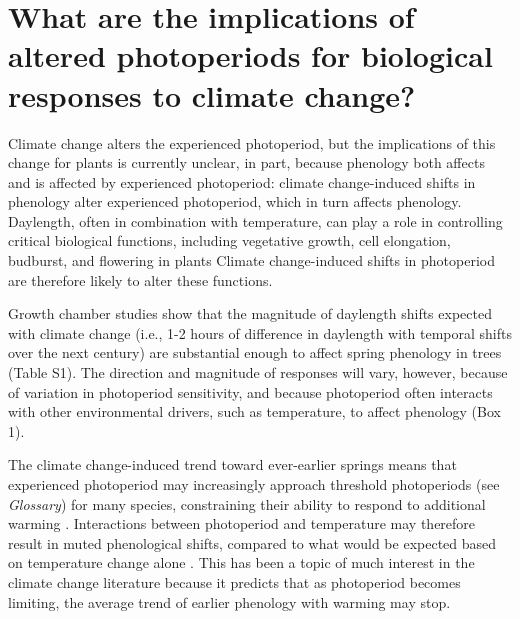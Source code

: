\documentclass{article}
\begin{document}
\section*{What are the implications of altered photoperiods for biological responses to climate change?}
Climate change alters the experienced photoperiod, but the implications of this change for plants is currently unclear, in part, because phenology both affects and is affected by experienced photoperiod: climate change-induced shifts in phenology alter experienced photoperiod, which in turn affects phenology. Daylength, often in combination with temperature, can play a role in controlling critical biological functions, including vegetative growth, cell elongation, budburst, and flowering in plants \citep{fu2019,Heide:2012aa,Heide:2011aa,Hsu:2011,sidaway2010,mimura2007,Linkosalo:2006aa,erwin1998,Ashby:1962aa} %
Climate change-induced shifts in photoperiod are therefore likely to alter these functions. 

\par Growth chamber studies show that the magnitude of daylength shifts expected with climate change (i.e., 1-2 hours of difference in daylength with temporal shifts over the next century) are substantial enough to affect spring phenology in trees (Table S1). The direction and magnitude of responses will vary, however, because of variation in photoperiod sensitivity, and because photoperiod often interacts with other environmental drivers, such as temperature, to affect phenology (Box 1). 

\par The climate change-induced trend toward ever-earlier springs means that experienced photoperiod may increasingly approach threshold photoperiods (see \emph{Glossary}) for many species, constraining their ability to respond to additional warming \citep{fu2019,vitasse2013,koerner2010a,Morin:2010aa,Nienstaedt:1966aa}. Interactions between photoperiod and temperature may therefore result in muted phenological shifts, compared to what would be expected based on temperature change alone \citep{koerner2010a,mimura2007,wareing1956}. This has been a topic of much interest in the climate change literature because it predicts that as photoperiod becomes limiting, the average trend of earlier phenology with warming \citep{polgar2013,penuelas2002,menzel2000} may stop.
\end{document}
